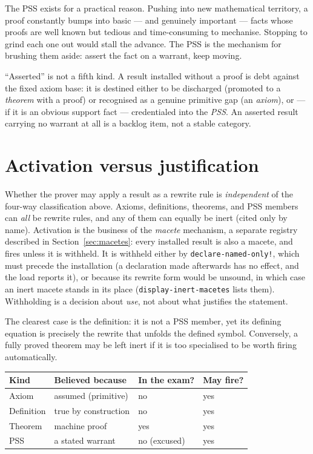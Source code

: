 \begin{remark}
The PSS exists for a practical reason.  Pushing into new
mathematical territory, a proof constantly bumps into basic --- and
genuinely important --- facts whose proofs are well known but tedious and
time-consuming to mechanise.  Stopping to grind each one out would stall
the advance.  The PSS is the mechanism for brushing them aside: assert the
fact on a warrant, keep moving.
\end{remark}

\begin{remark}
``Asserted'' is not a fifth kind.  A result installed without a proof is
debt against the fixed axiom base: it is destined either to be discharged
(promoted to a \emph{theorem} with a proof) or recognised as a genuine
primitive gap (an \emph{axiom}), or --- if it is an obvious support fact
--- credentialed into the \emph{PSS}.  An asserted result carrying no
warrant at all is a backlog item, not a stable category.
\end{remark}

\section{Activation versus justification}
\label{sec:firing}

Whether the prover may apply a result as a rewrite rule is
\emph{independent} of the four-way classification above.  Axioms,
definitions, theorems, and PSS members can \emph{all} be rewrite rules,
and any of them can equally be inert (cited only by name).  Activation is
the business of the \emph{macete} mechanism, a separate registry described
in Section~\ref{sec:macetes}: every installed result is also a macete,
and fires unless it is withheld.  It is withheld either by
\texttt{declare-named-only!}, which must precede the installation (a
declaration made afterwards has no effect, and the load reports it), or
because its rewrite form would be unsound, in which case an inert macete
stands in its place (\texttt{display-inert-macetes} lists them).
Withholding is a decision about \emph{use}, not about what justifies the
statement.

The clearest case is the definition: it is not a PSS member, yet its
defining equation is precisely the rewrite that unfolds the defined
symbol.  Conversely, a fully proved theorem may be left inert if it is too
specialised to be worth firing automatically.

\begin{center}
\begin{tabular}{@{}llll@{}}
\toprule
\textbf{Kind} & \textbf{Believed because} & \textbf{In the exam?} & \textbf{May fire?}\\
\midrule
Axiom      & assumed (primitive)   & no  & yes\\
Definition & true by construction  & no  & yes\\
Theorem    & machine proof         & yes & yes\\
PSS        & a stated warrant      & no (excused) & yes\\
\bottomrule
\end{tabular}
\end{center}

